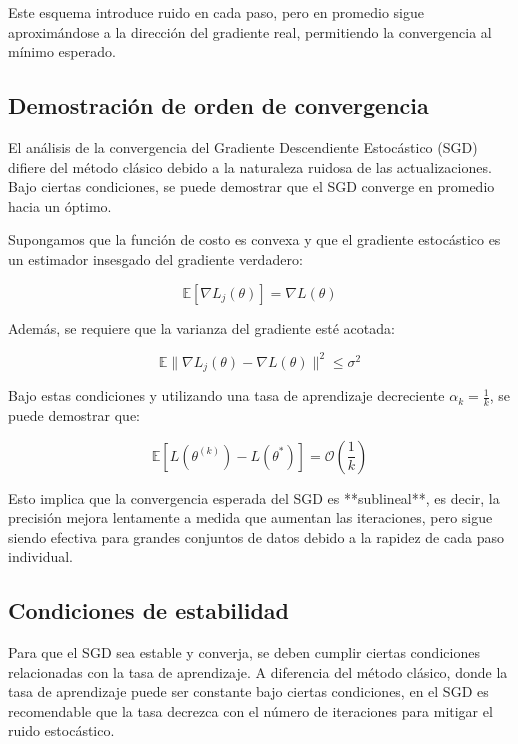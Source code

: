 \documentclass[12pt, letterpaper,conference]{IEEEtran}
\begin{document}
Este esquema introduce ruido en cada paso, pero en promedio sigue aproximándose a la dirección del gradiente real, permitiendo la convergencia al mínimo esperado.

\vspace{0.25cm}

\subsection{Demostración de orden de convergencia}

El análisis de la convergencia del Gradiente Descendiente Estocástico (SGD) difiere del método clásico debido a la naturaleza ruidosa de las actualizaciones. Bajo ciertas condiciones, se puede demostrar que el SGD converge en promedio hacia un óptimo.

Supongamos que la función de costo es convexa y que el gradiente estocástico es un estimador insesgado del gradiente verdadero:

\[
\mathbb{E}[\nabla L_j(\theta)] = \nabla L(\theta)
\]

Además, se requiere que la varianza del gradiente esté acotada:

\[
\mathbb{E}\| \nabla L_j(\theta) - \nabla L(\theta) \|^2 \leq \sigma^2
\]

Bajo estas condiciones y utilizando una tasa de aprendizaje decreciente \( \alpha_k = \frac{1}{k} \), se puede demostrar que:

\[
\mathbb{E}[L(\theta^{(k)}) - L(\theta^*)] = \mathcal{O}\left( \frac{1}{k} \right)
\]

Esto implica que la convergencia esperada del SGD es **sublineal**, es decir, la precisión mejora lentamente a medida que aumentan las iteraciones, pero sigue siendo efectiva para grandes conjuntos de datos debido a la rapidez de cada paso individual.


\vspace{0.25cm}

\subsection{Condiciones de estabilidad}

Para que el SGD sea estable y converja, se deben cumplir ciertas condiciones relacionadas con la tasa de aprendizaje. A diferencia del método clásico, donde la tasa de aprendizaje puede ser constante bajo ciertas condiciones, en el SGD es recomendable que la tasa decrezca con el número de iteraciones para mitigar el ruido estocástico.
\end{document}
